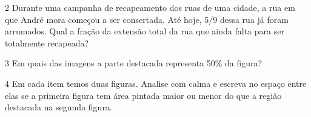 {\begin{escolha}
\end{escolha}


\num{2} Durante uma campanha de recapeamento dos ruas de uma cidade, a rua
em que André mora começou a ser consertada. Até hoje, 5/9 dessa rua já
foram arrumados. Qual a fração da extensão total da rua que ainda falta para ser totalmente recapeada?



\num{3} Em quais das imagens a parte destacada representa 50\% da figura?




\num{4} Em cada item temos duas figuras. Analise com calma e escreva no
espaço entre elas se a primeira figura tem área pintada maior ou menor
do que a região destacada na segunda figura.


%
%
%
%
%

}
